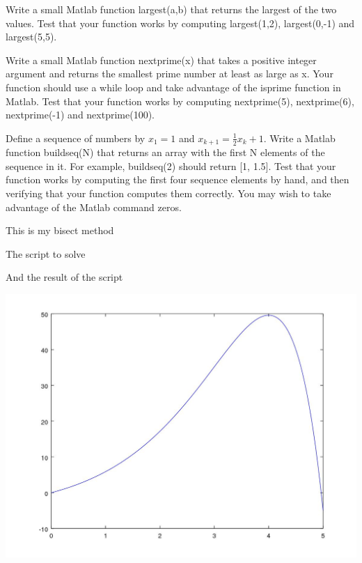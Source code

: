 \documentclass[12pt]{article}
\makeatletter
\theoremstyle{homework}
\newenvironment{exercise}[1]
{\def\@currentlabel{#1}\exercisecore}
{\endexercisecore}
\makeatother
\begin{document}
\begin{exercise}{1}
Write a small Matlab function largest(a,b) that returns the largest of the two values.
Test that your function works by computing largest(1,2), largest(0,-1) and
largest(5,5).
\end{exercise}



\newpage
\begin{exercise}{2}
Write a small Matlab function nextprime(x) that takes a positive integer argument and
returns the smallest prime number at least as large as x. Your function should use a while
loop and take advantage of the isprime function in Matlab. Test that your function
works by computing nextprime(5), nextprime(6), nextprime(-1) and nextprime(100).

\end{exercise}


\newpage
\begin{exercise}{3}
Define a sequence of numbers by $x_1 = 1$ and $x_{k+1} =\frac{1}{2}x_k + 1$. Write a Matlab function
buildseq(N) that returns an array with the first N elements of the sequence in it. For
example, buildseq(2) should return [1, 1.5]. Test that your function works by computing
the first four sequence elements by hand, and then verifying that your function computes
them correctly. You may wish to take advantage of the Matlab command zeros.
\end{exercise}



\newpage
\begin{exercise}{Chapter 4: 2(a)}
\end{exercise}
This is my bisect method


The script to solve


\newpage
And the result of the script

\includegraphics[scale=.5]{../octave/q4fig.jpg}
\end{document}
